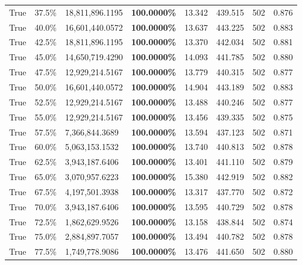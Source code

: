 \begin{table}[H]
\begin{tabular}{lllrllll}
\cline{1-8}
True & 37.5\% & 18,811,896.1195 & \bfseries \color{red} 100.0000\% & 13.342 & 439.515 & 502 & 0.876 \\
\cline{1-8}
True & 40.0\% & 16,601,440.0572 & \bfseries \color{red} 100.0000\% & 13.637 & 443.225 & 502 & 0.883 \\
\cline{1-8}
True & 42.5\% & 18,811,896.1195 & \bfseries \color{red} 100.0000\% & 13.370 & 442.034 & 502 & 0.881 \\
\cline{1-8}
True & 45.0\% & 14,650,719.4290 & \bfseries \color{red} 100.0000\% & 14.093 & 441.785 & 502 & 0.880 \\
\cline{1-8}
True & 47.5\% & 12,929,214.5167 & \bfseries \color{red} 100.0000\% & 13.779 & 440.315 & 502 & 0.877 \\
\cline{1-8}
True & 50.0\% & 16,601,440.0572 & \bfseries \color{red} 100.0000\% & 14.904 & 443.189 & 502 & 0.883 \\
\cline{1-8}
True & 52.5\% & 12,929,214.5167 & \bfseries \color{red} 100.0000\% & 13.488 & 440.246 & 502 & 0.877 \\
\cline{1-8}
True & 55.0\% & 12,929,214.5167 & \bfseries \color{red} 100.0000\% & 13.456 & 439.335 & 502 & 0.875 \\
\cline{1-8}
True & 57.5\% & 7,366,844.3689 & \bfseries \color{red} 100.0000\% & 13.594 & 437.123 & 502 & 0.871 \\
\cline{1-8}
True & 60.0\% & 5,063,153.1532 & \bfseries \color{red} 100.0000\% & 13.740 & 440.813 & 502 & 0.878 \\
\cline{1-8}
True & 62.5\% & 3,943,187.6406 & \bfseries \color{red} 100.0000\% & 13.401 & 441.110 & 502 & 0.879 \\
\cline{1-8}
True & 65.0\% & 3,070,957.6223 & \bfseries \color{red} 100.0000\% & 15.380 & 442.919 & 502 & 0.882 \\
\cline{1-8}
True & 67.5\% & 4,197,501.3938 & \bfseries \color{red} 100.0000\% & 13.317 & 437.770 & 502 & 0.872 \\
\cline{1-8}
True & 70.0\% & 3,943,187.6406 & \bfseries \color{red} 100.0000\% & 13.595 & 440.729 & 502 & 0.878 \\
\cline{1-8}
True & 72.5\% & 1,862,629.9526 & \bfseries \color{red} 100.0000\% & 13.158 & 438.844 & 502 & 0.874 \\
\cline{1-8}
True & 75.0\% & 2,884,897.7057 & \bfseries \color{red} 100.0000\% & 13.494 & 440.782 & 502 & 0.878 \\
\cline{1-8}
True & 77.5\% & 1,749,778.9086 & \bfseries \color{red} 100.0000\% & 13.476 & 441.650 & 502 & 0.880 \\

\end{tabular}
\end{table}
